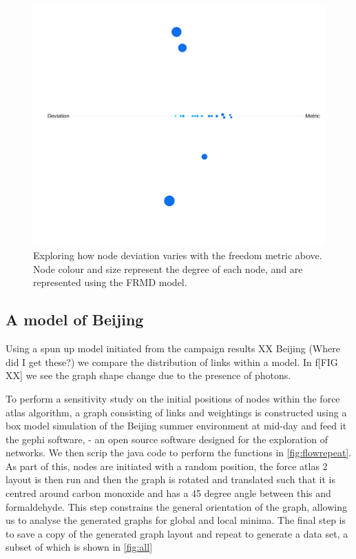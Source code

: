      \begin{figure}[H]
         \centering
     \includegraphics[width=\textwidth]{figures_c1/frmd_devmet.png}
     \caption{Exploring how node deviation varies with the freedom metric above. Node colour and size represent the degree of each node, and are represented using the FRMD model. }
     \label{fig:frmd_devmet}
     \end{figure}
 
 
 
 
 
 \newpage



\subsection{A model of Beijing}
Using a spun up model initiated from the campaign results XX Beijing (Where did I get these?) we compare the distribution of links within a model. In f[FIG XX] we see the graph shape change due to the presence of photons. 


To perform a sensitivity study on the initial positions of nodes within the force atlas algorithm, a graph consisting of links and weightings is constructed using a box model simulation of the Beijing summer environment at mid-day and feed it the gephi software, \cite{gephi} - an open source software designed for the exploration of networks. We then scrip the java code to perform the functions in \autoref{fig:flowrepeat}. As part of this, nodes are initiated with a random position, the force atlas 2 layout is then run and then the graph is rotated and translated such that it is centred around carbon monoxide and has a 45 degree angle between this and formaldehyde. This step constrains the general orientation of the graph, allowing us to analyse the generated graphs for global and local minima. The final step is to save a copy of the generated graph layout and repeat to generate a data set, a subset of which is shown in  \autoref{fig:all}


